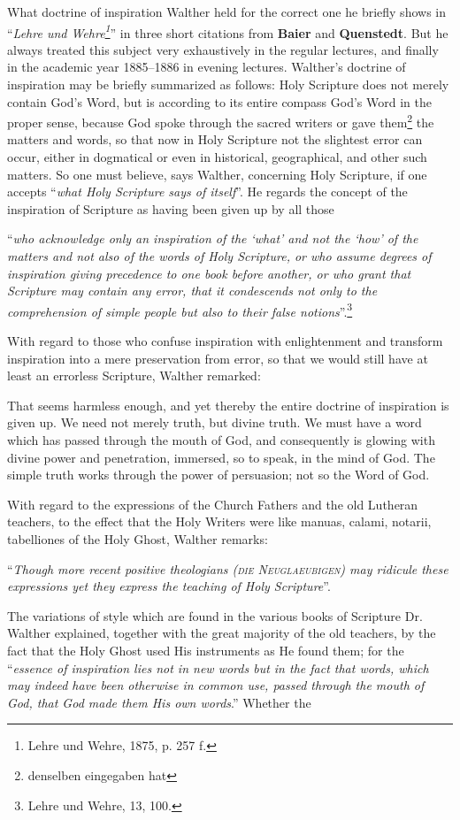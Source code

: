                 What doctrine of inspiration Walther held for the correct one he briefly shows in “\textit{Lehre und Wehre\footnote{Lehre und Wehre, 1875, p. 257 f.}}'' in three short citations from \textbf{Baier} and \textbf{Quenstedt}.  But he always treated this subject very exhaustively in the regular lectures, and finally in the academic year 1885--1886 in evening lectures.  Walther’s doctrine of inspiration may be briefly summarized as follows: Holy Scripture does not merely contain God’s Word, but is according to its entire compass God’s Word in the proper sense, because God spoke through the sacred writers or gave them\footnote{denselben eingegaben hat} the matters and words, so that now in Holy Scripture not the slightest error can occur, either in dogmatical or even in historical, geographical, and other such matters.  So one must believe, says Walther, concerning Holy Scripture, if one accepts ``\textit{what Holy Scripture says of itself}”.  He regards the concept of the inspiration of Scripture as having been given up by all those \begin{displayquote}“\textit{who acknowledge only an inspiration of the ‘what’ and not the ‘how’ of the matters and not also of the words of Holy Scripture, or who assume degrees of inspiration giving precedence to one book before another, or who grant that Scripture may contain any error, that it condescends not only to the comprehension of simple people but also to their false notions}”.\footnote{Lehre und Wehre, 13, 100.}\end{displayquote}  With regard to those who confuse inspiration with enlightenment and transform inspiration into a mere preservation from error, so that we would still have at least an errorless Scripture, Walther remarked: \begin{fancyquotes}That seems harmless enough, and yet thereby the entire doctrine of inspiration is given up.  We need not merely truth, but divine truth.  We must have a word which has passed through the mouth of God, and consequently is glowing with divine power and penetration, immersed, so to speak, in the mind of God.  The simple truth works through the power of persuasion; not so the Word of God.\end{fancyquotes}  With regard to the expressions of the Church Fathers and the old Lutheran teachers, to the effect that the Holy Writers were like manuas, calami, notarii, tabelliones of the Holy Ghost, Walther remarks: \begin{displayquote}“\textit{Though more recent positive theologians {\scriptsize\textsc{(die Neuglaeubigen)}} may ridicule these expressions yet they express the teaching of Holy Scripture}”.\end{displayquote}  The variations of style which are found in the various books of Scripture Dr. Walther explained, together with the great majority of the old teachers, by the fact that the Holy Ghost used His instruments as He found them; for the “\textit{essence of inspiration lies not in new words but in the fact that words, which may indeed have been otherwise in common use, passed through the mouth of God, that God made them His own words}.”  Whether the 